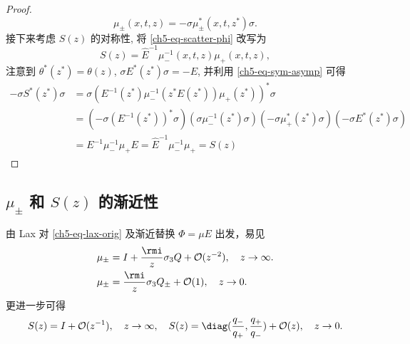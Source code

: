 \begin{proof}
\begin{equation}
        \mu_{\pm}(x,t,z) = -\sigma \mu_{\pm}^{*}(x,t,z^{*}) \sigma.
        \label{ch5-eq-sym-mu}
    \end{equation}
    接下来考虑 $ S(z) $ 的对称性, 将 \eqref{ch5-eq-scatter-phi} 改写为
    \begin{equation}
        S(z) = \hat{E}^{-1} \mu_{-}^{-1}(x,t,z) \mu_{+}(x,t,z),
    \end{equation}
    注意到 $ \theta^{*}(z^{*}) = \theta(z) $, $ \sigma E^{*}(z^{*}) \sigma = - E $, 并利用 \eqref{ch5-eq-sym-asymp} 可得
    \begin{equation}
        \begin{aligned}
            -\sigma S^{*}(z^{*}) \sigma & = \sigma \left( E^{-1}(z^{*}) \mu_{-}^{-1}(z^{*} E(z^{*})) \mu_{+}(z^{*})\right)^{*} \sigma                                                                                                     \\
                                        & = \left( -\sigma (E^{-1}(z^{*}))^{*} \sigma \right) \left( \sigma \mu_{-}^{-1}(z^{*}) \sigma \right) \left( -\sigma \mu_{+}^{*}(z^{*})\sigma \right) \left( -\sigma E^{*}(z^{*}) \sigma \right) \\
                                        & = E^{-1} \mu_{-}^{-1} \mu_{+} E = \hat{E}^{-1} \mu_{-}^{-1} \mu_{+} = S(z)
        \end{aligned}
    \end{equation}
\end{proof}
\subsection{$\mu_{\pm}$ 和 $S(z)$ 的渐近性}
由 Lax 对 \eqref{ch5-eq-lax-orig} 及渐近替换 $\Phi = \mu E$ 出发，易见
\begin{align}
    \mu_{\pm} & = I + \frac{\rmi}{z} \sigma_{3} Q + \mathcal{O}(z^{-2}), \quad z \to \infty. \label{ch5-eq-mu-zinf} \\
    \mu_{\pm} & = \frac{\rmi}{z} \sigma_{3} Q_{\pm} + \mathcal{O}(1), \quad z \to 0. \label{ch5-eq-mu-z0}
\end{align}
更进一步可得
\begin{equation}
    S(z) = I + \mathcal{O}(z^{-1}), \quad z \to \infty, \quad S(z) = \diag(\frac{q_{-}}{q_{+}}, \frac{q_{+}}{q_{-}}) + \mathcal{O}(z), \quad z \to 0.
    \label{ch5-eq-S-asymptotic}
\end{equation}

